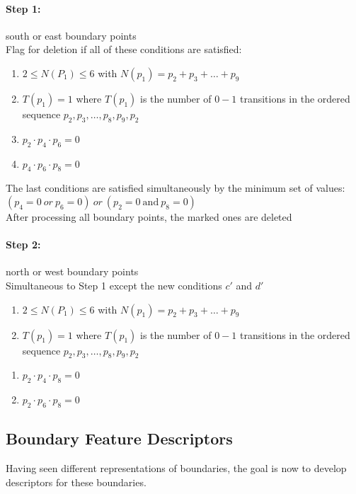 \paragraph{Step 1:} south or east boundary points\\
Flag for deletion if all of these conditions are satisfied:
\begin{enumerate}[label={\alph*)}]
\item $2\leq N(P_1)\leq 6$ with $N(p_1)=p_2 + p_3 + \ldots + p_9$
\item $T(p_1)=1$ where $T(p_1)$ is the number of $0-1$ transitions in the ordered sequence $p_2,p_3,\ldots ,p_8,p_9,p_2$
\item $p_2 \cdot p_4 \cdot p_6 = 0$
\item $p_4 \cdot p_6 \cdot p_8 = 0$
\end{enumerate}
The last conditions are satisfied simultaneously by the minimum set of values: $(p_4=0\ or\ p_6=0)\ or \ (p_2=0\ \text{and} \ p_8=0)$\\
After processing all boundary points, the marked ones are deleted\\
\paragraph{Step 2:} north or west boundary points\\
Simultaneous to Step 1 except the new conditions $c'$ and $d'$\\
\begin{enumerate}[label={\alph*)}]
\item $2\leq N(P_1)\leq 6$ with $N(p_1)=p_2 + p_3 + \ldots + p_9$
\item $T(p_1)=1$ where $T(p_1)$ is the number of $0-1$ transitions in the ordered sequence $p_2,p_3,\ldots ,p_8,p_9,p_2$
\end{enumerate}
\begin{enumerate}[label={\alph*')},resume]
\item $p_2 \cdot p_4 \cdot p_8 = 0$
\item $p_2 \cdot p_6 \cdot p_8 = 0$
\end{enumerate}

\subsection{Boundary Feature Descriptors}
\label{sec:boundaryFeatureDescriptors}
Having seen different representations of boundaries, the goal is now to develop descriptors for these boundaries.
